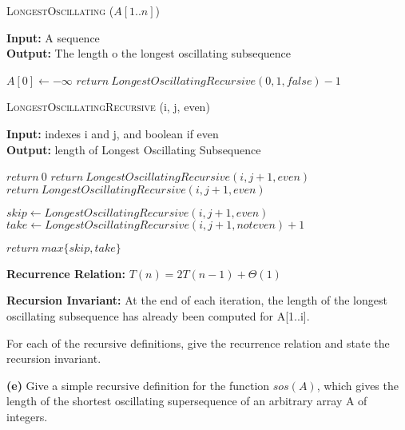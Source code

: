 \documentclass{article}
\begin{document}
\begin{algorithm} \caption{\textsc{LongestOscillating} ($A[1..n]$)}\label{alg:seb}
    {\bf Input:} A sequence\\
    {\bf Output:} The length o the longest oscillating subsequence
    \begin{algorithmic}[1]
        \State$A[0] \gets - \infty$
        \State$return\ LongestOscillatingRecursive(0, 1, false) -1$
    \end{algorithmic}
\end{algorithm}

\begin{algorithm} \caption{\textsc{LongestOscillatingRecursive} (i, j, even)}\label{alg:seb}
    {\bf Input:} indexes i and j, and boolean if even\\
    {\bf Output:} length of Longest Oscillating Subsequence
    \begin{algorithmic}[1]
            \State$return\ 0$
                \State$return\ LongestOscillatingRecursive(i, j+1, even)$
            \EndIf{}
        \Else{}
                \State$return\ LongestOscillatingRecursive(i, j+1, even)$
            \EndIf{}
        \EndIf{}

        \State$skip \gets LongestOscillatingRecursive(i, j+1, even)$
        \State$take \gets LongestOscillatingRecursive(i, j+1, not even) +1$

        \State$return\ max\{skip, take\}$
    \end{algorithmic}
\end{algorithm}

{\bf Recurrence Relation: } $T(n) = 2T(n-1) + \Theta(1)$

{\bf Recursion Invariant:} At the end of each iteration, the length of the longest oscillating subsequence has already been computed for A[1..i].



For each of the recursive definitions, give the recurrence
relation and state the recursion invariant.

{\bf (e)} Give a simple recursive definition for the function $sos(A)$, which gives
the length of the shortest oscillating supersequence of an arbitrary array
A of integers.
\end{document}
